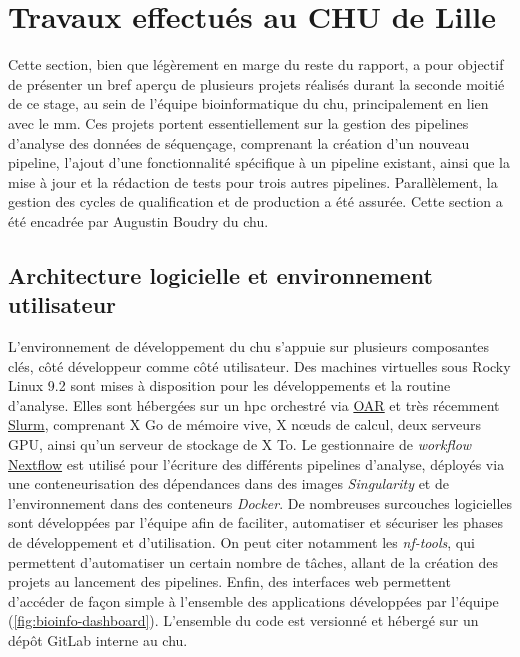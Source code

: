 
\chapter{Travaux effectués au CHU de Lille}

Cette section, bien que légèrement en marge du reste du rapport, a pour
objectif de présenter un bref aperçu de plusieurs projets réalisés durant la
seconde moitié de ce stage, au sein de l'équipe bioinformatique du \gls{chu},
principalement en lien avec le \gls{mm}. Ces projets portent essentiellement
sur la gestion des pipelines d'analyse des données de séquençage, comprenant la
création d'un nouveau pipeline, l'ajout d'une fonctionnalité spécifique à un
pipeline existant, ainsi que la mise à jour et la rédaction de tests pour trois
autres pipelines. Parallèlement, la gestion des cycles de qualification et de
production a été assurée. Cette section a été encadrée par Augustin Boudry du
\gls{chu}.

\section{Architecture logicielle et environnement utilisateur}

L'environnement de développement du \gls{chu} s'appuie sur plusieurs
composantes clés, côté développeur comme côté utilisateur. Des machines
virtuelles sous Rocky Linux 9.2 sont mises à disposition pour les
développements et la routine d'analyse. Elles sont hébergées sur un \gls{hpc}
orchestré via \href{https://oar.imag.fr/}{OAR} et très récemment
\href{https://slurm.schedmd.com/documentation.html}{Slurm}, comprenant X Go de
mémoire vive, X nœuds de calcul, deux serveurs GPU, ainsi qu'un serveur de
stockage de X To. Le gestionnaire de \textit{workflow}
\href{https://www.nextflow.io/}{Nextflow} est utilisé pour l'écriture des
différents pipelines d'analyse, déployés via une conteneurisation des
dépendances dans des images \textit{Singularity} et de l'environnement dans des
conteneurs \textit{Docker}. De nombreuses surcouches logicielles sont
développées par l'équipe afin de faciliter, automatiser et sécuriser les phases
de développement et d'utilisation. On peut citer notamment les
\textit{nf-tools}, qui permettent d'automatiser un certain nombre de tâches,
allant de la création des projets au lancement des pipelines. Enfin, des
interfaces web permettent d'accéder de façon simple à l'ensemble des
applications développées par l'équipe (\autoref{fig:bioinfo-dashboard}).
L'ensemble du code est versionné et hébergé sur un dépôt GitLab interne au
\gls{chu}.

